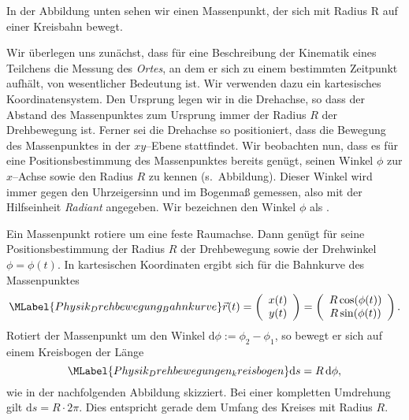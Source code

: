 \begin{MContent}
In der Abbildung unten sehen wir einen Massenpunkt, der sich mit Radius R auf einer Kreisbahn bewegt.


 Wir \"uberlegen uns zun\"achst, dass f\"ur eine Beschreibung der Kinematik eines Teilchens die Messung des \emph{Ortes}, an dem er sich zu einem bestimmten Zeitpunkt aufh\"alt, von wesentlicher Bedeutung ist. Wir verwenden dazu ein kartesisches Koordinatensystem. Den Ursprung legen wir in die Drehachse, so dass der Abstand des Massenpunktes zum Ursprung immer der Radius $R$ der Drehbewegung ist. Ferner sei die Drehachse so positioniert, dass die Bewegung des Massenpunktes in der $xy$--Ebene stattfindet. Wir beobachten nun, dass es f\"ur eine Positionsbestimmung des Massenpunktes bereits gen\"ugt, seinen Winkel $\phi$  zur $x$--Achse sowie den Radius $R$ zu kennen (s.~Abbildung). Dieser Winkel wird immer gegen den Uhrzeigersinn und im Bogenma{\ss} gemessen, also mit der Hilfseinheit \emph{Radiant} angegeben. Wir bezeichnen den Winkel $\phi$ als . 




\begin{MInfo}
Ein Massenpunkt rotiere um eine feste Raumachse. Dann gen\"ugt f\"ur seine Positionsbestimmung der Radius $R$ der Drehbewegung sowie der Drehwinkel $\phi=\phi(t)$. In kartesischen Koordinaten ergibt sich f\"ur die Bahnkurve des Massenpunktes 
\begin{equation}\MLabel{Physik_Drehbewegung_Bahnkurve}
\vec{r}(t)=\left(\begin{array}{c} x(t) \\ y(t) \end{array}\right)=\left(\begin{array}{c} R\cos(\phi(t)) \\ R\sin(\phi(t)) \end{array}\right).\\
\end{equation}
Rotiert der Massenpunkt um den Winkel $\text{d}\phi:= \phi_2-\phi_1$, so bewegt er sich auf einem Kreisbogen der L\"ange 
\begin{equation}\MLabel{Physik_Drehbewegungen_kreisbogen}
\text{d}s=R\,\text{d}\phi,
\end{equation}
wie in der nachfolgenden Abbildung skizziert. Bei einer kompletten Umdrehung gilt $\text{d}s=R\cdot 2\pi$. Dies entspricht gerade dem Umfang des Kreises mit Radius $R$.
\end{MInfo}



\end{MContent}
